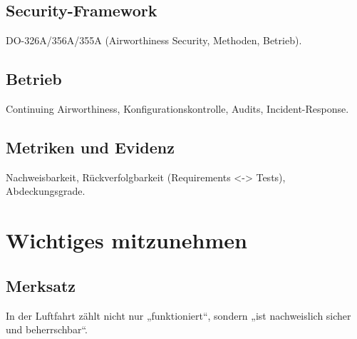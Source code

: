 \section{Security-Framework}
DO-326A/356A/355A (Airworthiness Security, Methoden, Betrieb).

\section{Betrieb}
Continuing Airworthiness, Konfigurationskontrolle, Audits, Incident-Response.

\section{Metriken und Evidenz}
Nachweisbarkeit, Rückverfolgbarkeit (Requirements <-> Tests), Abdeckungsgrade.




\chapter{Wichtiges mitzunehmen}
\section{Merksatz}
In der Luftfahrt zählt nicht nur „funktioniert“, sondern „ist nachweislich sicher und beherrschbar“.